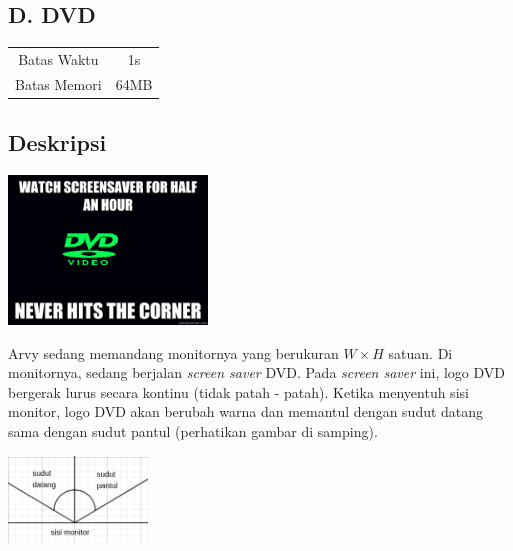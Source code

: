 \documentclass{article}
\begin{document}
\begin{center}
    \section*{D. DVD} %

    \begin{tabular}{ | c c | }
        \hline
        Batas Waktu  & 1s \\    %
        Batas Memori & 64MB \\  %
        \hline
    \end{tabular}
\end{center}

\subsection*{Deskripsi}

\begin{center}
    \includegraphics[width=200px]{meme}
\end{center}

\begin{multicols}{2}

Arvy sedang memandang monitornya yang berukuran $W \times H$ satuan.
Di monitornya, sedang berjalan \textit{screen saver} DVD.
Pada \textit{screen saver} ini, logo DVD bergerak lurus secara kontinu (tidak patah - patah).
Ketika menyentuh sisi monitor, logo DVD akan berubah warna dan memantul dengan sudut datang sama dengan sudut pantul (perhatikan gambar di samping).

\begin{center}
    \includegraphics[width=140px]{pantul}
\end{center}
\end{multicols}
\end{document}
